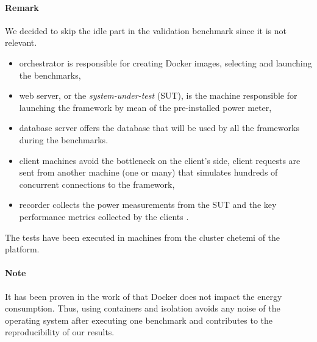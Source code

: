 \paragraph{Remark}
We decided to skip the idle part in the validation benchmark since it is not relevant.



\begin{itemize}
    \item \textsf{orchestrator} is responsible for creating Docker images, selecting and launching the benchmarks,
    \item \textsf{web server}, or the \emph{system-under-test} (SUT), is the machine responsible for launching the framework by mean of the pre-installed power meter,
    \item \textsf{database server} offers the database that will be used by all the frameworks during the benchmarks.
    \item \textsf{client machines} avoid the bottleneck on the client's side, client requests are sent from another machine (one or many) that simulates hundreds of concurrent connections to the framework,
    \item \textsf{recorder} collects the power measurements from the SUT and the key performance metrics collected by the clients .
\end{itemize}

The tests have been executed in machines from the cluster \textsf{chetemi} of the  platform.

\paragraph{Note}
It has been proven in the work of \citeauthor{eddie_antonio_santos_how} that Docker does not impact the energy consumption.
Thus, using containers and isolation avoids any noise of the operating system after executing one benchmark and contributes to the reproducibility of our results.

